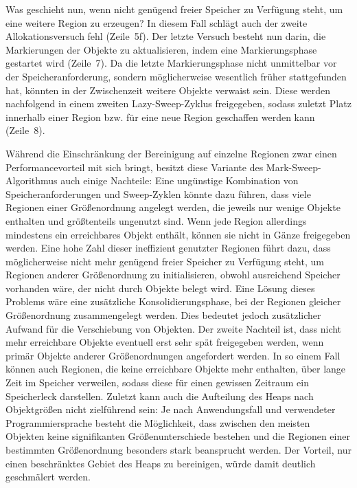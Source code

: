 Was geschieht nun, wenn nicht genügend freier Speicher zu Verfügung steht, um eine weitere Region zu erzeugen?
In diesem Fall schlägt auch der zweite Allokationsversuch fehl (Zeile~5f).
Der letzte Versuch besteht nun darin, die Markierungen der Objekte zu aktualisieren, indem eine Markierungsphase gestartet wird (Zeile~7).
Da die letzte Markierungsphase nicht unmittelbar vor der Speicheranforderung, sondern möglicherweise wesentlich früher stattgefunden hat, könnten in der Zwischenzeit weitere Objekte verwaist sein.
Diese werden nachfolgend in einem zweiten Lazy-Sweep-Zyklus freigegeben, sodass zuletzt Platz innerhalb einer Region bzw. für eine neue Region geschaffen werden kann (Zeile~8).

Während die Einschränkung der Bereinigung auf einzelne Regionen zwar einen Performancevorteil mit sich bringt, besitzt diese Variante des Mark-Sweep-Algorithmus auch einige Nachteile:
Eine ungünstige Kombination von Speicheranforderungen und Sweep-Zyklen könnte dazu führen, dass viele Regionen einer Größenordnung angelegt werden, die jeweils nur wenige Objekte enthalten und größtenteils ungenutzt sind.
Wenn jede Region allerdings mindestens ein erreichbares Objekt enthält, können sie nicht in Gänze freigegeben werden.
Eine hohe Zahl dieser ineffizient genutzter Regionen führt dazu, dass möglicherweise nicht mehr genügend freier Speicher zu Verfügung steht, um Regionen anderer Größenordnung zu initialisieren, obwohl ausreichend Speicher vorhanden wäre, der nicht durch Objekte belegt wird.
Eine Lösung dieses Problems wäre eine zusätzliche Konsolidierungsphase, bei der Regionen gleicher Größenordnung zusammengelegt werden.
Dies bedeutet jedoch zusätzlicher Aufwand für die Verschiebung von Objekten.
Der zweite Nachteil ist, dass nicht mehr erreichbare Objekte eventuell erst sehr spät freigegeben werden, wenn primär Objekte anderer Größenordnungen angefordert werden.
In so einem Fall können auch Regionen, die keine erreichbare Objekte mehr enthalten, über lange Zeit im Speicher verweilen, sodass diese für einen gewissen Zeitraum ein Speicherleck darstellen.
Zuletzt kann auch die Aufteilung des Heaps nach Objektgrößen nicht zielführend sein:
Je nach Anwendungsfall und verwendeter Programmiersprache besteht die Möglichkeit, dass zwischen den meisten Objekten keine signifikanten Größenunterschiede bestehen und die Regionen einer bestimmten Größenordnung besonders stark beansprucht werden.
Der Vorteil, nur einen beschränktes Gebiet des Heaps zu bereinigen, würde damit deutlich geschmälert werden.


